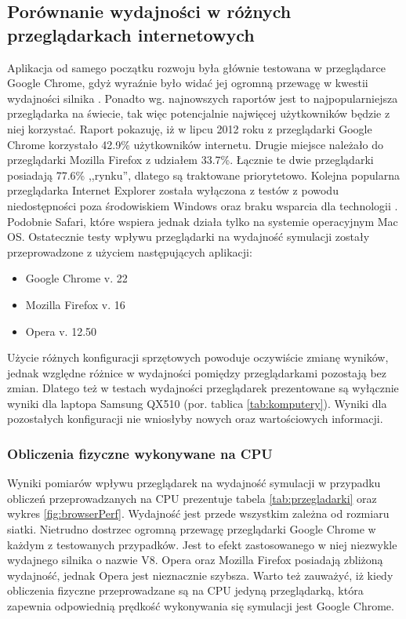 \subsection{Porównanie wydajności w różnych przeglądarkach internetowych}
\label{sec:przegladarkiWyd}

Aplikacja od samego początku rozwoju była głównie testowana w przeglądarce
Google Chrome, gdyż wyraźnie było widać jej ogromną przewagę w kwestii
wydajności silnika \js. Ponadto wg. najnowszych raportów jest to
najpopularniejsza przeglądarka na świecie, tak więc potencjalnie najwięcej
użytkowników \en będzie z niej korzystać. Raport \cite{BrowserStats} pokazuję,
iż w lipcu 2012 roku z przeglądarki Google Chrome korzystało 42.9\%
użytkowników internetu. Drugie miejsce należało do przeglądarki Mozilla
Firefox z udziałem 33.7\%. Łącznie te dwie przeglądarki posiadają 77.6\%
,,rynku'', dlatego są traktowane priorytetowo. Kolejna popularna przeglądarka
Internet Explorer została wyłączona z testów z powodu niedostępności poza
środowiskiem Windows oraz braku wsparcia dla technologii . Podobnie
Safari, które wspiera  jednak działa tylko na systemie operacyjnym
Mac OS. Ostatecznie testy wpływu przeglądarki na wydajność symulacji zostały
przeprowadzone z użyciem następujących aplikacji:

\begin{itemize}
\item Google Chrome v. 22
\item Mozilla Firefox v. 16
\item Opera v. 12.50
\end{itemize}

Użycie różnych konfiguracji sprzętowych powoduje oczywiście zmianę wyników,
jednak względne różnice w wydajności pomiędzy przeglądarkami pozostają bez
zmian. Dlatego też w testach wydajności przeglądarek prezentowane są wyłącznie
wyniki dla laptopa Samsung QX510 (por. tablica \ref{tab:komputery}). Wyniki
dla pozostałych konfiguracji nie wniosłyby nowych oraz wartościowych
informacji.

\subsubsection{Obliczenia fizyczne wykonywane na CPU}

Wyniki pomiarów wpływu przeglądarek na wydajność symulacji w przypadku
obliczeń przeprowadzanych na CPU prezentuje tabela \ref{tab:przegladarki} oraz
wykres \ref{fig:browserPerf}. Wydajność jest przede wszystkim zależna od
rozmiaru siatki. Nietrudno dostrzec ogromną przewagę przeglądarki Google
Chrome w każdym z testowanych przypadków. Jest to efekt zastosowanego w niej
niezwykle wydajnego silnika  o nazwie V8. Opera oraz Mozilla
Firefox posiadają zbliżoną wydajność, jednak Opera jest nieznacznie szybsza.
Warto też zauważyć, iż kiedy obliczenia fizyczne przeprowadzane są na CPU
jedyną przeglądarką, która zapewnia odpowiednią prędkość wykonywania się
symulacji jest Google Chrome.

